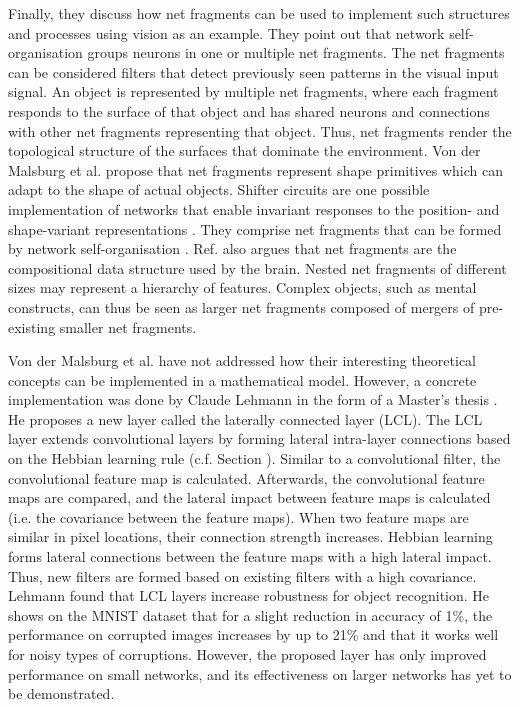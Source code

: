 Finally, they discuss how net fragments can be used to implement such structures and processes using vision as an example.
They point out that network self-organisation groups neurons in one or multiple net fragments.
The net fragments can be considered filters that detect previously seen patterns in the visual input signal.
An object is represented by multiple net fragments, where each fragment responds to the surface of that object and has shared neurons and connections with other net fragments representing that object.
Thus, net fragments render the topological structure of the surfaces that dominate the environment.
Von der Malsburg et al. \cite{von_der_Malsburg_Stadelmann_Grewe_2022} propose that net fragments represent shape primitives which can adapt to the shape of actual objects.
Shifter circuits are one possible implementation of networks that enable invariant responses to the position- and shape-variant representations .
They comprise net fragments that can be formed by network self-organisation .
Ref. \cite{von_der_Malsburg_Stadelmann_Grewe_2022} also argues that net fragments are the compositional data structure used by the brain.
Nested net fragments of different sizes may represent a hierarchy of features.
Complex objects, such as mental constructs, can thus be seen as larger net fragments composed of mergers of pre-existing smaller net fragments.

Von der Malsburg et al.  have not addressed how their interesting theoretical concepts can be implemented in a mathematical model.
However, a concrete implementation was done by Claude Lehmann in the form of a Master's thesis .
He proposes a new layer called the laterally connected layer (LCL).
The LCL layer extends convolutional layers by forming lateral intra-layer connections based on the Hebbian learning rule (c.f. Section ).
Similar to a convolutional filter, the convolutional feature map is calculated.
Afterwards, the convolutional feature maps are compared, and the lateral impact between feature maps is calculated (i.e. the covariance between the feature maps).
When two feature maps are similar in pixel locations, their connection strength increases.
Hebbian learning forms lateral connections between the feature maps with a high lateral impact.
Thus, new filters are formed based on existing filters with a high covariance.
Lehmann found that LCL layers increase robustness for object recognition.
He shows on the MNIST dataset \cite{Lecun_Bottou_Bengio_Haffner_1998} that for a slight reduction in accuracy of 1\%, the performance on corrupted images increases by up to 21\% and that it works well for noisy types of corruptions.
However, the proposed layer has only improved performance on small networks, and its effectiveness on larger networks has yet to be demonstrated.

